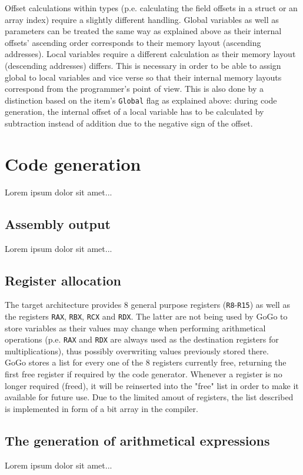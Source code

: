 \documentclass[a4paper]{scrreprt}
\begin{document}
      Offset calculations within types (p.e. calculating the field offsets in a struct or an array index) require a slightly different handling. Global variables as well as parameters can be treated the same way as explained above as their internal offsets' ascending order corresponds to their memory layout (ascending addresses). Local variables require a different calculation as their memory layout (descending addresses) differs. This is necessary in order to be able to assign global to local variables and vice verse so that their internal memory layouts correspond from the programmer's point of view. This is also done by a distinction based on the item's \texttt{Global} flag as explained above: during code generation, the internal offset of a local variable has to be calculated by subtraction instead of addition due to the negative sign of the offset.

  \chapter{Code generation}
    Lorem ipsum dolor sit amet...

    \section{Assembly output}
      Lorem ipsum dolor sit amet...

    \section{Register allocation}
        The target architecture provides 8 general purpose registers (\texttt{R8}-\texttt{R15}) as well as the registers \texttt{RAX}, \texttt{RBX}, \texttt{RCX} and \texttt{RDX}\cite{int09}. The latter are not being used by GoGo to store variables as their values may change when performing arithmetical operations (p.e. \texttt{RAX} and \texttt{RDX} are always used as the destination registers for multiplications), thus possibly overwriting values previously stored there.\\
        GoGo stores a list for every one of the 8 registers currently free, returning the first free register if required by the code generator. Whenever a register is no longer required (freed), it will be reinserted into the "free" list in order to make it available for future use. Due to the limited amout of registers, the list described is implemented in form of a bit array in the compiler.

    \section{The generation of arithmetical expressions}
      Lorem ipsum dolor sit amet...
\end{document}
